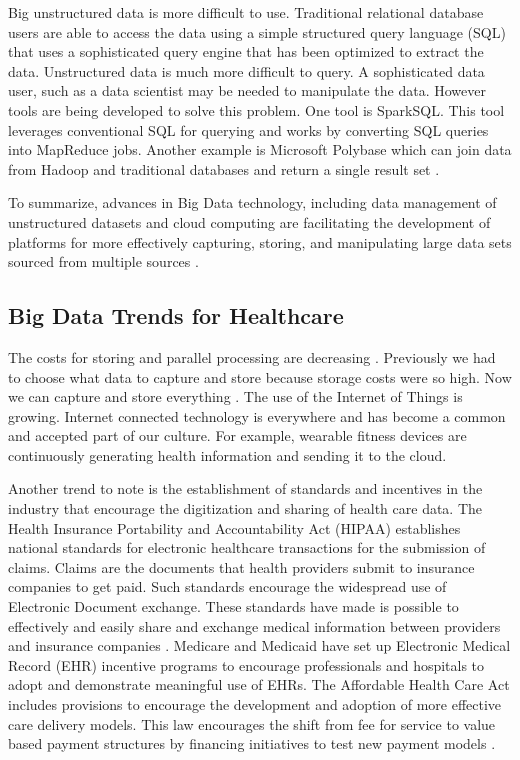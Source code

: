 \documentclass[sigconf]{acmart}
\begin{document}
Big unstructured data is more difficult to use.  Traditional relational database users are able to access the data using a simple structured query language (SQL) that uses a sophisticated query engine that has been optimized to extract the data.  Unstructured data is much more difficult to query. A sophisticated data user, such as a data scientist may be needed to manipulate the data. However tools are being developed to solve this problem. One tool is SparkSQL.  This tool leverages conventional SQL for querying and works by converting SQL queries into MapReduce jobs.  Another example is Microsoft Polybase which can join data from Hadoop and traditional databases and return a single result set \cite{www-google-HlthCat}. 

To summarize, advances in Big Data technology, including data management of unstructured datasets and cloud computing are facilitating the development of platforms for more effectively capturing, storing, and manipulating large data sets sourced from multiple sources \cite{springer}.  

\subsection{Big Data Trends for Healthcare}

The costs for storing and parallel processing are decreasing \cite{www-google-McDonald}. Previously we had to choose what data to capture and store because storage costs were so high. Now we can capture and store everything \cite{www-google-hadoop}.
The use of the Internet of Things is growing. Internet connected technology is everywhere and has become a common and accepted part of our culture.  For example, wearable fitness devices are continuously generating health information and sending it to the cloud. 

Another trend to note is the establishment of standards and incentives in the industry that encourage the digitization and sharing of health care data.  The Health Insurance Portability and Accountability Act (HIPAA) establishes national standards for electronic healthcare transactions for the submission of claims. Claims are the documents that health providers submit to insurance companies to get paid. Such standards encourage the widespread use of Electronic Document exchange. These standards have made is possible to effectively and easily share and exchange medical information between providers and insurance companies \cite{www-google-McDonald}.  
Medicare and Medicaid have set up Electronic Medical Record (EHR) incentive programs to encourage professionals and hospitals to adopt and demonstrate meaningful use of EHRs.  The Affordable Health Care Act includes provisions to encourage the development and adoption of more effective care delivery models. This law encourages the shift from fee for service to value based payment structures by financing  initiatives to test new payment models \cite{www-google-ACA}.  
\end{document}
